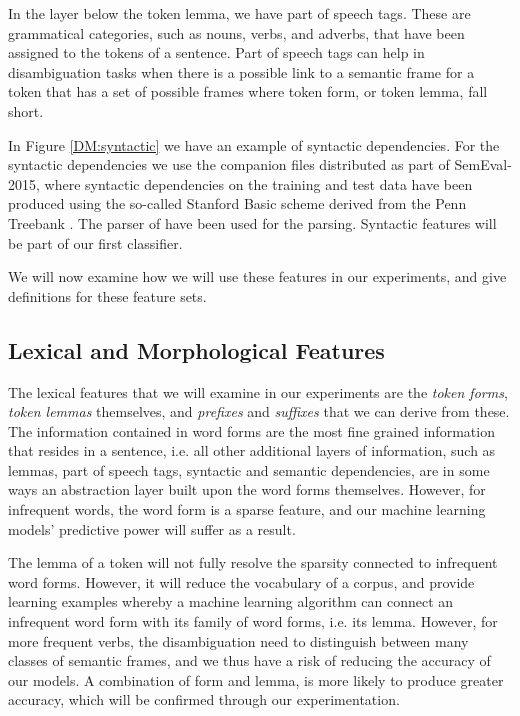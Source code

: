In the layer below the token lemma, we have part of speech tags. These are grammatical categories, such as nouns, verbs, and adverbs, that have been assigned to the tokens of a sentence. Part of speech tags can help in disambiguation tasks when there is a possible link to a semantic frame for a token that has a set of possible frames where token form, or token lemma, fall short.

In Figure \ref{DM:syntactic} we have an example of syntactic dependencies. For the syntactic dependencies we use the companion files distributed as part of SemEval-2015, where syntactic dependencies on the training and test data have been produced using the so-called Stanford Basic scheme derived from the Penn Treebank \cite{PennTreebank}. The parser of  have been used for the parsing. Syntactic features will be part of our first classifier.

We will now examine how we will use these features in our experiments, and give definitions for these feature sets.

\subsection{Lexical and Morphological Features}

The lexical features that we will examine in our experiments are the \textit{token forms}, \textit{token lemmas} themselves, and \textit{prefixes} and \textit{suffixes} that we can derive from these. The information contained in word forms are the most fine grained information that resides in a sentence, i.e. all other additional layers of information, such as lemmas, part of speech tags, syntactic and semantic dependencies, are in some ways an abstraction layer built upon the word forms themselves. However, for infrequent words, the word form is a sparse feature, and our machine learning models' predictive power will suffer as a result.

The lemma of a token will not fully resolve the sparsity connected to infrequent word forms. However, it will reduce the vocabulary of a corpus, and provide learning examples whereby a machine learning algorithm can connect an infrequent word form with its family of word forms, i.e. its lemma. However, for more frequent verbs, the disambiguation need to distinguish between many classes of semantic frames, and we thus have a risk of reducing the accuracy of our models. A combination of form and lemma, is more likely to produce greater accuracy, which will be confirmed through our experimentation.

